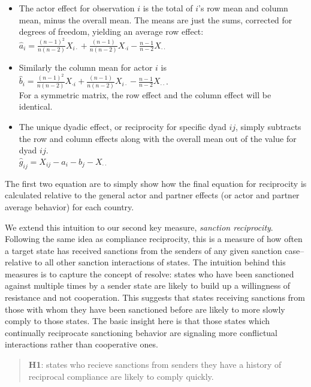  \begin{itemize}
 \item The actor effect for observation $i$ is the total of $i$'s row mean and column mean, minus the overall mean.  The means are just the sums, corrected for degrees of freedom, yielding an average row effect:\\
 $\hat{a}_i = \frac{(n-1)^2}{n(n-2)} X_{i \cdot} + \frac{(n-1)}{n(n-2)} X_{\cdot i} -  \frac{n-1}{n-2} X_{\cdot \cdot} $
\item Similarly the column mean for actor $i$ is \\
 $\hat{b}_i = \frac{(n-1)^2}{n(n-2)} X_{\cdot i} + \frac{(n-1)}{n(n-2)} X_{i \cdot } -  \frac{n-1}{n-2} X_{\cdot \cdot} $.\\ For a symmetric matrix, the row effect and the column effect will be identical.
\item The unique dyadic effect, or reciprocity for specific dyad $ij$, simply subtracts the row and column effects along with the overall mean out of the value for dyad $ij$. \\
$\hat{g}_{ij} = X_{ij} - \hat{a}_i - \hat{b}_j - X_{\cdot \cdot}$
 \end{itemize}

\doublespacing
The first two equation are to simply show how the final equation for reciprocity is calculated relative to the general actor and partner effects (or actor and partner average behavior) for each country.

We extend this intuition to our second key measure, \textit{sanction reciprocity}. Following the same idea as compliance reciprocity, this is a measure of how often a target state has received sanctions from the senders of any given sanction case--relative to all other sanction interactions of states. The intuition behind this measures is to capture the concept of resolve: states who have been sanctioned against multiple times by a sender state are likely to build up a willingness of resistance and not cooperation.  This suggests that states receiving sanctions from those with whom they have been sanctioned before are likely to more slowly comply to those states. The basic insight here is that those states which continually reciprocate sanctioning behavior are signaling more conflictual interactions rather than cooperative ones. 

\begin{quote}
	\textbf{H1}: states who recieve sanctions from senders they have a history of reciprocal compliance are likely to comply quickly. 
\end{quote}

